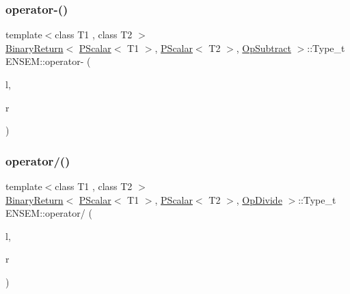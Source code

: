 \mbox{\label{group__primscalar_gad6a80202334f9602e241a71a58828d69}} 
\subsubsection{\texorpdfstring{operator-\/()}{operator-()}\hspace{0.1cm}{\footnotesize\ttfamily [2/2]}}
{\footnotesize\ttfamily template$<$class T1 , class T2 $>$ \\
\mbox{\hyperlink{structENSEM_1_1BinaryReturn}{Binary\+Return}}$<$ \mbox{\hyperlink{classENSEM_1_1PScalar}{P\+Scalar}}$<$ T1 $>$, \mbox{\hyperlink{classENSEM_1_1PScalar}{P\+Scalar}}$<$ T2 $>$, \mbox{\hyperlink{structENSEM_1_1OpSubtract}{Op\+Subtract}} $>$\+::Type\+\_\+t E\+N\+S\+E\+M\+::operator-\/ (\begin{DoxyParamCaption}\item[{const \mbox{\hyperlink{classENSEM_1_1PScalar}{P\+Scalar}}$<$ T1 $>$ \&}]{l,  }\item[{const \mbox{\hyperlink{classENSEM_1_1PScalar}{P\+Scalar}}$<$ T2 $>$ \&}]{r }\end{DoxyParamCaption})\hspace{0.3cm}{\ttfamily [inline]}}

\mbox{\label{group__primscalar_ga45ba7920db563ad713c3977adc283ede}} 
\subsubsection{\texorpdfstring{operator/()}{operator/()}}
{\footnotesize\ttfamily template$<$class T1 , class T2 $>$ \\
\mbox{\hyperlink{structENSEM_1_1BinaryReturn}{Binary\+Return}}$<$ \mbox{\hyperlink{classENSEM_1_1PScalar}{P\+Scalar}}$<$ T1 $>$, \mbox{\hyperlink{classENSEM_1_1PScalar}{P\+Scalar}}$<$ T2 $>$, \mbox{\hyperlink{structENSEM_1_1OpDivide}{Op\+Divide}} $>$\+::Type\+\_\+t E\+N\+S\+E\+M\+::operator/ (\begin{DoxyParamCaption}\item[{const \mbox{\hyperlink{classENSEM_1_1PScalar}{P\+Scalar}}$<$ T1 $>$ \&}]{l,  }\item[{const \mbox{\hyperlink{classENSEM_1_1PScalar}{P\+Scalar}}$<$ T2 $>$ \&}]{r }\end{DoxyParamCaption})\hspace{0.3cm}{\ttfamily [inline]}}

